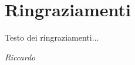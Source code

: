 \chapter*{Ringraziamenti}
Testo dei ringraziamenti...

\vspace{1.5em}
\begin{flushright}
 \textit{Riccardo}
\end{flushright}
